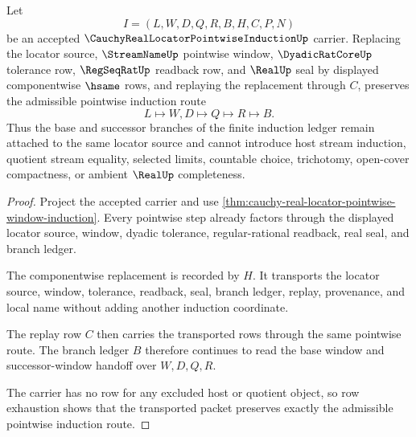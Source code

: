 \begin{theorem}
\label{thm:cauchy-real-locator-pointwise-induction-window-stability}
Let
$$
I=(L,W,D,Q,R,B,H,C,P,N)
$$
be an accepted $\CauchyRealLocatorPointwiseInductionUp$ carrier. Replacing the locator source, $\StreamNameUp$ pointwise window, $\DyadicRatCoreUp$ tolerance row, $\RegSeqRatUp$ readback row, and $\RealUp$ seal by displayed componentwise $\hsame$ rows, and replaying the replacement through $C$, preserves the admissible pointwise induction route
$$
L\longmapsto W,D\longmapsto Q\longmapsto R\longmapsto B .
$$
Thus the base and successor branches of the finite induction ledger remain attached to the same locator source and cannot introduce host stream induction, quotient stream equality, selected limits, countable choice, trichotomy, open-cover compactness, or ambient $\RealUp$ completeness.
\end{theorem}
\begin{proof}
Project the accepted carrier and use \autoref{thm:cauchy-real-locator-pointwise-window-induction}. Every pointwise step already factors through the displayed locator source, window, dyadic tolerance, regular-rational readback, real seal, and branch ledger.

The componentwise replacement is recorded by $H$. It transports the locator source, window, tolerance, readback, seal, branch ledger, replay, provenance, and local name without adding another induction coordinate.

The replay row $C$ then carries the transported rows through the same pointwise route. The branch ledger $B$ therefore continues to read the base window and successor-window handoff over $W,D,Q,R$.

The carrier has no row for any excluded host or quotient object, so row exhaustion shows that the transported packet preserves exactly the admissible pointwise induction route.
\end{proof}

